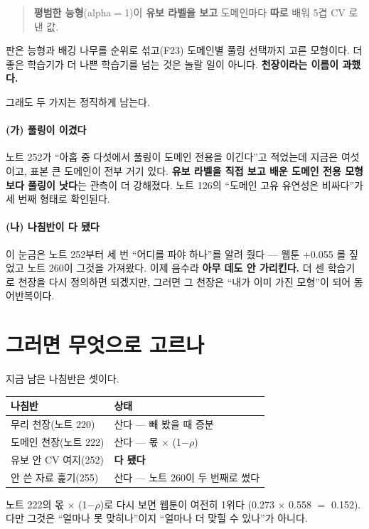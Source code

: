 \documentclass[10pt]{article}
\begin{document}
\begin{quote}\small
\textbf{평범한 능형}(alpha$=$1)이 \textbf{유보 라벨을 보고} 도메인마다
\textbf{따로} 배워 5겹 CV 로 낸 값.
\end{quote}

판은 능형과 배깅 나무를 순위로 섞고(F23) 도메인별 풀링 선택까지 고른
모형이다. 더 좋은 학습기가 더 나쁜 학습기를 넘는 것은 놀랄 일이 아니다.
\textbf{천장이라는 이름이 과했다.}

그래도 두 가지는 정직하게 남는다.

\paragraph{(가) 풀링이 이겼다} 노트 252가 ``아홉 중 다섯에서 풀링이 도메인
전용을 이긴다''고 적었는데 지금은 여섯이고, 표본 큰 도메인이 전부 거기
있다. \textbf{유보 라벨을 직접 보고 배운 도메인 전용 모형보다 풀링이 낫다}는
관측이 더 강해졌다. 노트 126의 ``도메인 고유 유연성은 비싸다''가 세 번째
형태로 확인된다.

\paragraph{(나) 나침반이 다 됐다} 이 눈금은 노트 252부터 세 번 ``어디를
파야 하나''를 알려 줬다 --- 웹툰 $+$0.055 를 짚었고 노트 260이 그것을
가져왔다. 이제 음수라 \textbf{아무 데도 안 가리킨다.} 더 센 학습기로 천장을
다시 정의하면 되겠지만, 그러면 그 천장은 ``내가 이미 가진 모형''이 되어
동어반복이다.

\section{그러면 무엇으로 고르나}

지금 남은 나침반은 셋이다.

\begin{center}\small
\begin{tabular}{ll}
\hline
나침반 & 상태 \\
\hline
무리 천장(노트 220) & 산다 --- 빼 봤을 때 증분 \\
도메인 천장(노트 222) & 산다 --- 몫 $\times$ (1$-\rho$) \\
유보 안 CV 여지(252) & \textbf{다 됐다} \\
안 쓴 자료 훑기(255) & 산다 --- 노트 260이 두 번째로 썼다 \\
\hline
\end{tabular}
\end{center}

노트 222의 몫 $\times$ (1$-\rho$)로 다시 보면 웹툰이 여전히 1위다
(0.273 $\times$ 0.558 $=$ 0.152). 다만 그것은 ``얼마나 못 맞히나''이지
``얼마나 더 맞힐 수 있나''가 아니다.
\end{document}
